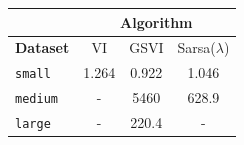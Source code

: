 \documentclass[10pt,letterpaper]{article}
\begin{document}
\begin{multicols*}{2}
	\begin{center}
		\vspace*{10pt}
		\label{tab:runtime}
		\begin{tabular}{l|c|c|c|}
			\cline{2-4}
			                                       &                           \multicolumn{3}{c|}{\textbf{Algorithm}}                           \\ \hline
			\multicolumn{1}{|l|}{\textbf{Dataset}} & \multicolumn{1}{c|}{VI} & \multicolumn{1}{c|}{GSVI} & \multicolumn{1}{c|}{Sarsa($\lambda$)} \\ \hline
			\multicolumn{1}{|l|}{\texttt{small}}            & 1.264                   & 0.922                     & 1.046                                 \\ \hline
			\multicolumn{1}{|l|}{\texttt{medium}}           & -                       & 5460                      & 628.9                                 \\ \hline
			\multicolumn{1}{|l|}{\texttt{large}}            & -                       & 220.4                     & -                                     \\ \hline
		\end{tabular}
	\end{center}
	
\end{multicols*}
	
\end{document}
